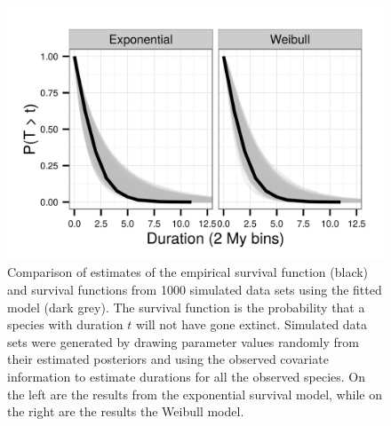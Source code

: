 \documentclass{pnastwo}
\begin{document}
\begin{figure}[ht]
  \centering
  \includegraphics{figure/survival_function}
  \caption{Comparison of estimates of the empirical survival function (black) and survival functions from 1000 simulated data sets using the fitted model (dark grey). The survival function is the probability that a species with duration \(t\) will not have gone extinct. Simulated data sets were generated by drawing parameter values randomly from their estimated posteriors and using the observed covariate information to estimate durations for all the observed species. On the left are the results from the exponential survival model, while on the right are the results the Weibull model.}
  \label{fig:ppc_surv}
\end{figure}
\end{document}
